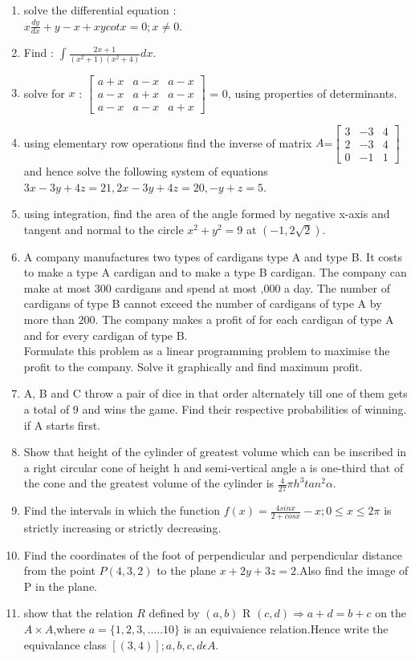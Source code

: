 \documentclass[12pt,-letter paper]{article}
\providecommand{\myvec}[1]{\ensuremath{\begin{bmatrix}#1\end{bmatrix}}}
\begin{document}
\begin{enumerate}
\item solve the differential equation : \\ $x\frac{dy}{dx}+y-x+xycotx=0 ; x\neq0$.
\item Find : $\int\frac{2x+1}{(x^2+1)(x^2+4)}dx$.
\item solve for $x$ : $\myvec{a+x & a-x & a-x \\ a-x & a+x & a-x \\ a-x & a-x & a+x }$ = 0, using properties of determinants.
\item using elementary row operations find the inverse of matrix $A$=$\myvec{3 & -3 & 4 \\ 2 & -3 & 4 \\ 0 & -1 & 1}$ and hence solve the following system of equations $3x-3y+4z=21,2x-3y+4z=20,-y+z=5$.
\item using integration, find the area of the angle formed by negative x-axis and tangent and normal to the circle $x^2+y^2=9$ at $(-1,2\sqrt{2})$.
\item A company manufactures two types of cardigans type A and type B. It costs  to make a type A cardigan and  to make a type B cardigan. The company can make at most $300$ cardigans and spend at most ,000 a day. The number of cardigans of type B cannot exceed the number of cardigans of type A by more than $200$. The company makes a profit of  for each cardigan of type A and  for every cardigan of type B.\\
Formulate this problem as a linear programming problem to maximise the profit to the company. Solve it graphically and find maximum profit.
\item A, B and C throw a pair of dice in that order alternately till one of them gets a total of $9$ and wins the game. Find their respective probabilities of winning. if A starts first.
\item Show that height of the cylinder of greatest volume which can be inscribed in a right circular cone of height h and semi-vertical angle a is one-third that of the cone and the greatest volume of the cylinder is $\frac{4}{27}\pi h^3 tan^2{\alpha}$.
\item Find the intervals in which the function $f(x)=\frac{4sinx}{2+cosx}-x; 0\leq x \leq 2\pi$ is strictly increasing or strictly decreasing.
\item Find the coordinates of the foot of perpendicular and perpendicular distance from the point $P(4 , 3 , 2 )$ to the plane $x+2y+3z=2$.Also find the image of P in the plane.
\item show that the relation $R$ defined by $(a,b)$ R $(c,d) \Rightarrow a+d=b+c$ on the $A\times A$,where $a=\{1,2,3,.....10\}$ is an equivaience relation.Hence write the equivalance class $[(3,4)] ;a,b,c,d \epsilon A$. 
\end{enumerate}
\end{document}
